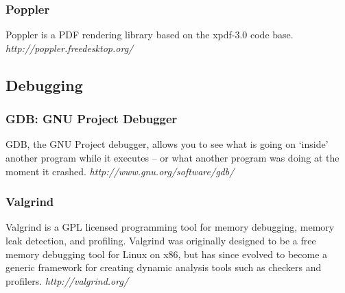 \subsubsection{Poppler}
Poppler is a PDF rendering library based on the xpdf-3.0 code base. \newline
\emph{http://poppler.freedesktop.org/}


\subsection{Debugging}
\subsubsection{GDB: GNU Project Debugger}
GDB, the GNU Project debugger, allows you to see what is going on `inside' another program while it executes -- or what another program was doing at the moment it crashed. \newline
\emph{http://www.gnu.org/software/gdb/}

\subsubsection{Valgrind}
Valgrind is a GPL licensed programming tool for memory debugging, memory leak detection, and profiling. Valgrind was originally designed to be a free memory debugging tool for Linux on x86, but has since evolved to become a generic framework for creating dynamic analysis tools such as checkers and profilers. \newline
\emph{http://valgrind.org/}
